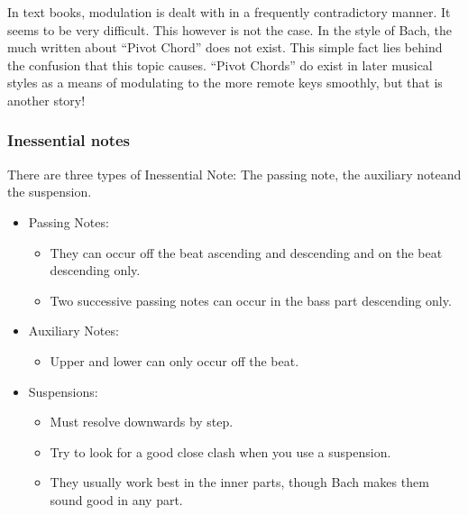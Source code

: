 \documentclass{article}
\begin{document}
In text books, modulation is dealt with in a frequently contradictory manner.
It seems to be very difficult.
This however is not the case.
In the style of Bach, the much written about ``Pivot Chord'' does not exist.
This simple fact lies behind the confusion that this topic causes.
``Pivot Chords'' do exist in later musical styles as a means of modulating to the more remote keys smoothly, but that is another story!

\subsubsection{Inessential notes}

There are three types of Inessential Note: The passing note, the auxiliary note\footnotemark and the suspension.


\begin{itemize}
    \item[] Passing Notes:
        \begin{itemize}
            \item They can occur off the beat ascending and descending and on the beat descending only.
            \item Two successive passing notes can occur in the bass part descending only.
        \end{itemize}
    \item[] Auxiliary Notes:
        \begin{itemize}
            \item Upper and lower can only occur off the beat.
        \end{itemize}
    \item[] Suspensions:
        \begin{itemize}
            \item Must resolve downwards by step.
            \item Try to look for a good close clash when you use a suspension.\footnotemark
            \item They usually work best in the inner parts, though Bach makes them sound good in any part.
        \end{itemize}
\end{itemize}

\end{document}
